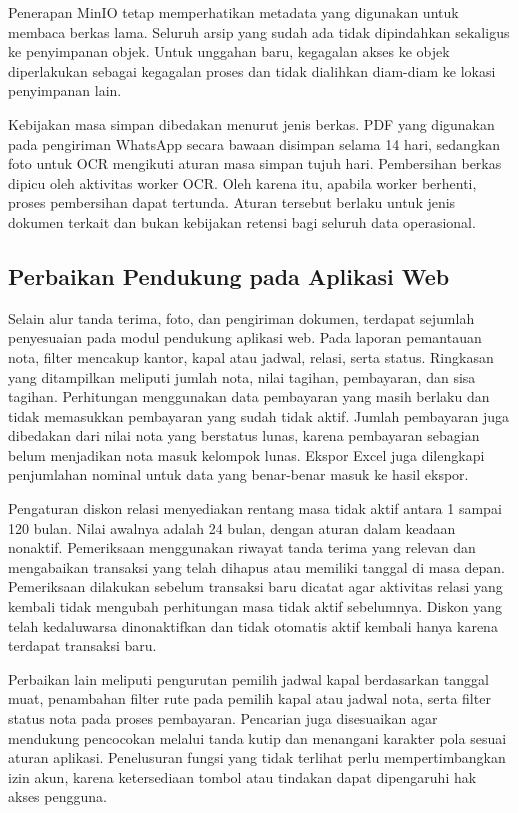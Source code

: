 Penerapan MinIO tetap memperhatikan metadata yang digunakan untuk membaca berkas lama. Seluruh arsip yang sudah ada tidak dipindahkan sekaligus ke penyimpanan objek. Untuk unggahan baru, kegagalan akses ke objek diperlakukan sebagai kegagalan proses dan tidak dialihkan diam-diam ke lokasi penyimpanan lain.

Kebijakan masa simpan dibedakan menurut jenis berkas. PDF yang digunakan pada pengiriman WhatsApp secara bawaan disimpan selama 14 hari, sedangkan foto untuk OCR mengikuti aturan masa simpan tujuh hari. Pembersihan berkas dipicu oleh aktivitas worker OCR. Oleh karena itu, apabila worker berhenti, proses pembersihan dapat tertunda. Aturan tersebut berlaku untuk jenis dokumen terkait dan bukan kebijakan retensi bagi seluruh data operasional.

\subsection{Perbaikan Pendukung pada Aplikasi Web}

Selain alur tanda terima, foto, dan pengiriman dokumen, terdapat sejumlah penyesuaian pada modul pendukung aplikasi web. Pada laporan pemantauan nota, filter mencakup kantor, kapal atau jadwal, relasi, serta status. Ringkasan yang ditampilkan meliputi jumlah nota, nilai tagihan, pembayaran, dan sisa tagihan. Perhitungan menggunakan data pembayaran yang masih berlaku dan tidak memasukkan pembayaran yang sudah tidak aktif. Jumlah pembayaran juga dibedakan dari nilai nota yang berstatus lunas, karena pembayaran sebagian belum menjadikan nota masuk kelompok lunas. Ekspor Excel juga dilengkapi penjumlahan nominal untuk data yang benar-benar masuk ke hasil ekspor.

Pengaturan diskon relasi menyediakan rentang masa tidak aktif antara 1 sampai 120 bulan. Nilai awalnya adalah 24 bulan, dengan aturan dalam keadaan nonaktif. Pemeriksaan menggunakan riwayat tanda terima yang relevan dan mengabaikan transaksi yang telah dihapus atau memiliki tanggal di masa depan. Pemeriksaan dilakukan sebelum transaksi baru dicatat agar aktivitas relasi yang kembali tidak mengubah perhitungan masa tidak aktif sebelumnya. Diskon yang telah kedaluwarsa dinonaktifkan dan tidak otomatis aktif kembali hanya karena terdapat transaksi baru.

Perbaikan lain meliputi pengurutan pemilih jadwal kapal berdasarkan tanggal muat, penambahan filter rute pada pemilih kapal atau jadwal nota, serta filter status nota pada proses pembayaran. Pencarian juga disesuaikan agar mendukung pencocokan melalui tanda kutip dan menangani karakter pola sesuai aturan aplikasi. Penelusuran fungsi yang tidak terlihat perlu mempertimbangkan izin akun, karena ketersediaan tombol atau tindakan dapat dipengaruhi hak akses pengguna.


